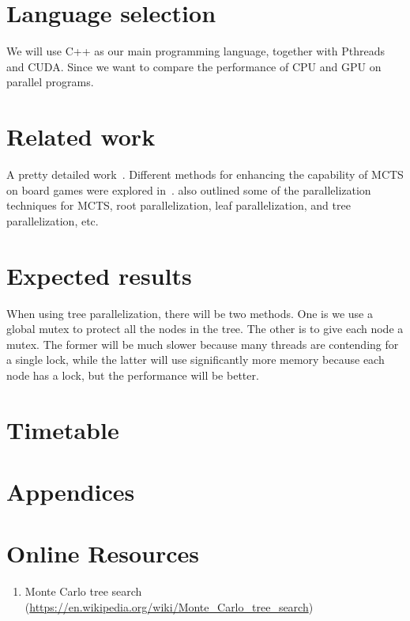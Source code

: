 \documentclass[sigconf]{acmart}
\begin{document}
\section{Language selection}
We will use C++ as our main programming language, together with Pthreads and CUDA. Since we want to compare the performance of CPU and GPU on parallel programs.


\section{Related work}

A pretty detailed work~\cite{liu2020effective}. Different methods for enhancing the capability of MCTS on board games were explored in~\cite{weigel2017monte}. \cite{weigel2017monte}\cite{guillaumeMCTS} also outlined some of the parallelization techniques for MCTS, root parallelization, leaf parallelization, and tree parallelization, etc.

\section{Expected results}
When using tree parallelization, there will be two methods. One is we use a global mutex to protect all the nodes in the tree. The other is to give each node a mutex. The former will be much slower because many threads are contending for a single lock, while the latter will use significantly more memory because each node has a lock, but the performance will be better. 



\section{Timetable}





\section{Appendices}



\appendix

\section{Online Resources}
\begin{enumerate}
  \item Monte Carlo tree search (\url{https://en.wikipedia.org/wiki/Monte_Carlo_tree_search})
\end{enumerate}
\end{document}
